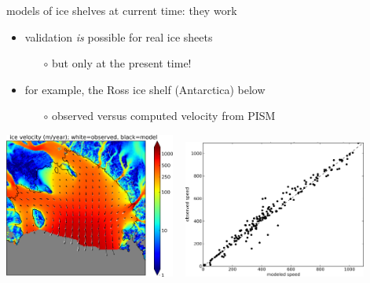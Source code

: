 \documentclass[10pt,hyperref={pdfpagelabels=true}]{beamer}
\begin{document}
\begin{frame}{models of ice shelves at current time: they work}

\begin{itemize}
\item validation \emph{is} possible for real ice sheets
  \begin{itemize}
  \item[$\circ$] \alert{but only at the present time!}
  \end{itemize}
\item for example, the Ross ice shelf (Antarctica) below
  \begin{itemize}
  \item[$\circ$] observed versus computed velocity from PISM
  \end{itemize}
\end{itemize}

\begin{center}
  \mbox{\includegraphics[width=0.42\textwidth]{rossquiver} \, \includegraphics[width=0.45\textwidth]{rossscatter}}
\end{center}
\end{frame}
\end{document}
